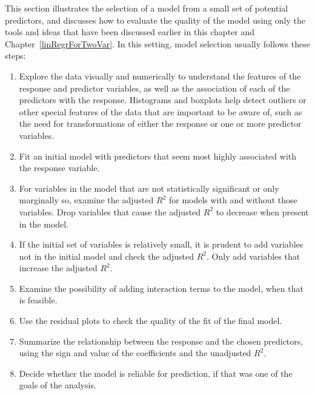 This section illustrates the selection of a model from a small set of potential predictors, and discusses how to evaluate the quality of the model using only the tools and ideas that have been discussed earlier in this chapter and Chapter~\ref{linRegrForTwoVar}.  In this setting, model selection usually follows these steps: 

\begin{enumerate}
	
  \item Explore the data visually and numerically to understand the features of the response and predictor variables, as well as the association of each of the predictors with the response.  Histograms and boxplots help detect outliers or other special features of the data that are important to be aware of, such as the need for transformations of either the response or one or more predictor variables. 
  
  \item Fit an initial model with predictors that seem most highly associated with the response variable.
  
  \item For variables in the model that are not statistically significant or only marginally so, examine the adjusted $R^2$ for models with and without those variables. Drop variables that cause the adjusted $R^2$ to decrease when present in the model.
  
  \item If the initial set of variables is relatively small, it is prudent to add variables not in the initial model and check the adjusted $R^2$.  Only add variables that increase the adjusted $R^2$.

  \item Examine the possibility of adding interaction terms to the model, when that is feasible. 
  
  \item Use the residual plots to check the quality of the fit of the final model.

  \item Summarize the relationship between the response and the chosen predictors, using the sign and value of the coefficients and the unadjusted $R^2$.

  \item Decide whether the model is reliable for prediction, if that was one of the goals of the analysis.

\end{enumerate}

